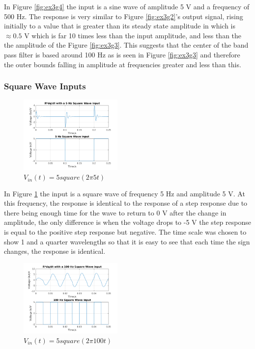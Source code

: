 \documentclass[11pt,a4paper]{article}
\begin{document}
\vspace{2mm}In Figure \ref{fig:ex3g4} the input is a sine wave of amplitude 5 V and a frequency of 500 Hz. The response is very similar to Figure \ref{fig:ex3g2}'s output signal, rising initially to a value that is greater than its steady state amplitude in which is $\approx 0.5$ V which is far 10 times less than the input amplitude, and less than the the amplitude of the Figure \ref{fig:ex3g3}. This suggests that the center of the band pass filter is based around 100 Hz as is seen in Figure \ref{fig:ex3g3} and therefore the outer bounds falling in amplitude at frequencies greater and less than this.

\subsubsection{Square Wave Inputs}

\begin{figure}
    \vspace{-40mm}
  		\includegraphics[width=0.45\textwidth]{Ex3_Figs/5Squ1.png}
	\vspace{-3mm}
  	\caption{$V_{in}(t)= 5square(2 \pi 5t)$}
  	\label{fig:ex3g5}
\end{figure}

\vspace{3mm}In Figure \ref{fig:ex3g5} the input is a square wave of frequency 5 Hz and amplitude 5 V. At this frequency, the response is identical to the response of a step response due to there being enough time for the wave to return to 0 V after the change in amplitude, the only difference is when the voltage drops to -5 V the step response is equal to the positive step response but negative. The time scale was chosen to show 1 and a quarter wavelengths so that it is easy to see that each time the sign changes, the response is identical.

\begin{figure}
    \vspace{-38mm}
  		\includegraphics[width=0.45\textwidth]{Ex3_Figs/100Squ1.png}
	\vspace{-3mm}
  	\caption{$V_{in}(t)= 5square(2 \pi 100t)$}
  	\label{fig:ex3g6}
\end{figure}
\end{document}
